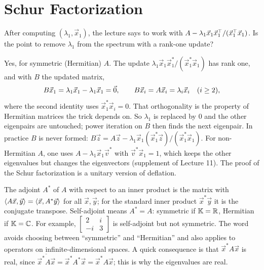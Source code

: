 \chapter{Schur Factorization}

\begin{question}
  \label{q:deflation-rank-one}
  After computing $(\lambda_1, \vec{x}_1)$, the lecture says to work with $A - \lambda_1\vec{x}_1\vec{x}_1^\top/(\vec{x}_1^\top\vec{x}_1)$. Is the point to remove $\lambda_1$ from the spectrum with a rank-one update?
\end{question}

\begin{answer}
  Yes, for symmetric (Hermitian) $A$. The update $\lambda_1\vec{x}_1\vec{x}_1^\ast/(\vec{x}_1^\ast\vec{x}_1)$ has rank one, and with $B$ the updated matrix,
  \begin{equation}
    B\vec{x}_1 = \lambda_1\vec{x}_1 - \lambda_1\vec{x}_1 = \vec{0}, \qquad B\vec{x}_i = A\vec{x}_i = \lambda_i\vec{x}_i \quad (i \ge 2),
  \end{equation}
  where the second identity uses $\vec{x}_1^\ast\vec{x}_i = 0$. That orthogonality is the property of Hermitian matrices the trick depends on. So $\lambda_1$ is replaced by $0$ and the other eigenpairs are untouched; power iteration on $B$ then finds the next eigenpair. In practice $B$ is never formed: $B\vec{z} = A\vec{z} - \lambda_1\vec{x}_1(\vec{x}_1^\ast\vec{z})/(\vec{x}_1^\ast\vec{x}_1)$. For non-Hermitian $A$, one uses $A - \lambda_1\vec{x}_1\vec{v}^\ast$ with $\vec{v}^\ast\vec{x}_1 = 1$, which keeps the other eigenvalues but changes the eigenvectors (supplement of Lecture 11). The proof of the Schur factorization is a unitary version of deflation.
\end{answer}

\begin{question}
  \label{q:self-adjoint}
\end{question}

\begin{answer}
  The adjoint $A^\ast$ of $A$ with respect to an inner product is the matrix with $\left\langle A\vec{x}, \vec{y} \right\rangle = \left\langle \vec{x}, A^\ast\vec{y} \right\rangle$ for all $\vec{x}, \vec{y}$; for the standard inner product $\vec{x}^\ast\vec{y}$ it is the conjugate transpose. Self-adjoint means $A^\ast = A$: symmetric if $\mathbb{K} = \mathbb{R}$, Hermitian if $\mathbb{K} = \mathbb{C}$. For example, $\left[\begin{smallmatrix} 2 & i \\ -i & 3 \end{smallmatrix}\right]$ is self-adjoint but not symmetric. The word avoids choosing between ``symmetric'' and ``Hermitian'' and also applies to operators on infinite-dimensional spaces. A quick consequence is that $\vec{x}^\ast A\vec{x}$ is real, since $\overline{\vec{x}^\ast A\vec{x}} = \vec{x}^\ast A^\ast\vec{x} = \vec{x}^\ast A\vec{x}$; this is why the eigenvalues are real.
\end{answer}


